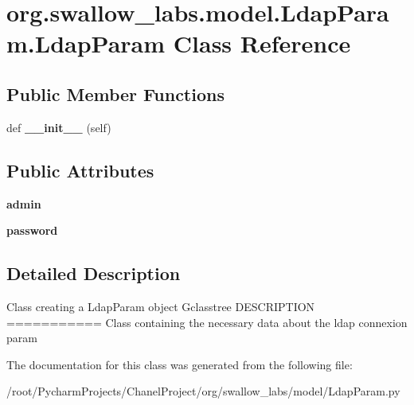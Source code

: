 \hypertarget{classorg_1_1swallow__labs_1_1model_1_1_ldap_param_1_1_ldap_param}{}\section{org.\+swallow\+\_\+labs.\+model.\+Ldap\+Param.\+Ldap\+Param Class Reference}
\label{classorg_1_1swallow__labs_1_1model_1_1_ldap_param_1_1_ldap_param}
\subsection*{Public Member Functions}
\begin{DoxyCompactItemize}
\item 
\hypertarget{classorg_1_1swallow__labs_1_1model_1_1_ldap_param_1_1_ldap_param_aa236e63495b54cec290e942703e5a746}{}def {\bfseries \+\_\+\+\_\+init\+\_\+\+\_\+} (self)\label{classorg_1_1swallow__labs_1_1model_1_1_ldap_param_1_1_ldap_param_aa236e63495b54cec290e942703e5a746}

\end{DoxyCompactItemize}
\subsection*{Public Attributes}
\begin{DoxyCompactItemize}
\item 
\hypertarget{classorg_1_1swallow__labs_1_1model_1_1_ldap_param_1_1_ldap_param_a6cde47a5629db22ca10e6e20e1d5434d}{}{\bfseries admin}\label{classorg_1_1swallow__labs_1_1model_1_1_ldap_param_1_1_ldap_param_a6cde47a5629db22ca10e6e20e1d5434d}

\item 
\hypertarget{classorg_1_1swallow__labs_1_1model_1_1_ldap_param_1_1_ldap_param_acc72fb8ecddc33b55986c4831e14e27d}{}{\bfseries password}\label{classorg_1_1swallow__labs_1_1model_1_1_ldap_param_1_1_ldap_param_acc72fb8ecddc33b55986c4831e14e27d}

\end{DoxyCompactItemize}


\subsection{Detailed Description}
\begin{DoxyVerb}    Class creating a LdapParam object
    G{classtree}
    DESCRIPTION
    ===========
    Class containing the necessary data about the ldap connexion param\end{DoxyVerb}
 

The documentation for this class was generated from the following file\+:\begin{DoxyCompactItemize}
\item 
/root/\+Pycharm\+Projects/\+Chanel\+Project/org/swallow\+\_\+labs/model/Ldap\+Param.\+py\end{DoxyCompactItemize}
